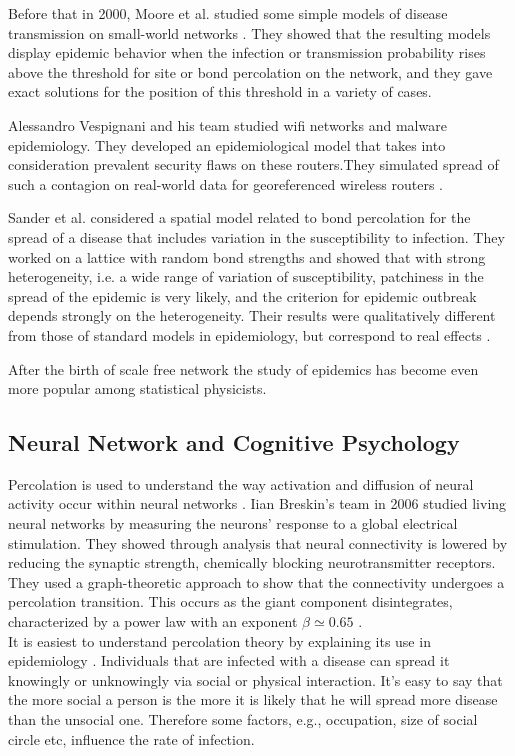 	Before that	in 2000, Moore et al. studied some simple models of disease transmission on small-world networks \cite{Moore2000}. They showed that the resulting models display epidemic behavior when the infection	or transmission probability rises above the threshold for site or bond percolation on the network,	and they gave exact solutions for the position of this threshold in a variety of cases. 
	
	Alessandro	Vespignani and his team studied wifi networks and malware epidemiology. They developed an	epidemiological model that takes into consideration prevalent security flaws on these routers.They	simulated spread of such a contagion on real-world data for georeferenced wireless routers \cite{Hu2009}.
	
	Sander et al. considered a spatial model related to bond percolation for the spread of a disease that	includes variation in the susceptibility to infection. They worked on a lattice with random bond	strengths and showed that with strong heterogeneity, i.e. a wide range of variation of susceptibility, patchiness in the spread of the epidemic is very likely, and the criterion for epidemic outbreak	depends strongly on the heterogeneity. Their results were qualitatively different from those of standard models in epidemiology, but correspond to real effects \cite{Sander2002}.
	
	After the birth of scale free	network the study of epidemics has become even more popular among statistical physicists.
	
	
	\subsection{Neural Network and Cognitive Psychology}
	Percolation is used to understand the way activation and diffusion of neural activity occur within neural networks \cite{Friedenberg2011}. Iian Breskin's team in 2006 studied living neural networks by measuring the neurons' response to a global electrical stimulation. They showed through analysis that neural connectivity is lowered by reducing the synaptic strength, chemically blocking neurotransmitter receptors. They used a graph-theoretic approach to show that the connectivity undergoes a percolation transition. This occurs as the giant component disintegrates, characterized by a power law with an exponent $\beta \simeq 0.65$	 \cite{Breskin2006}.\\
	
	It is easiest to understand percolation theory by explaining its use in epidemiology \cite{Moore2000}. Individuals that are infected with a disease can spread it knowingly or unknowingly via social or physical interaction. It's easy to say that the more social a person is the more it is likely that he will spread more disease than the unsocial one. Therefore some factors, e.g., occupation, size of social circle etc, influence the rate of infection. \\
	
